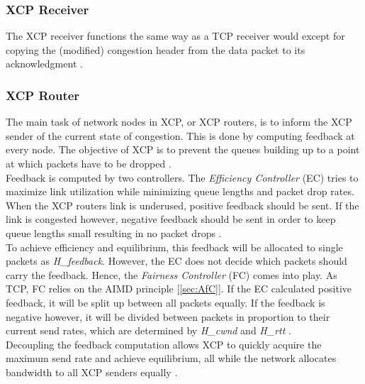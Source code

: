 \documentclass[a4paper,conference]{IEEEtran}
\begin{document}
\subsubsection*{XCP Receiver}
The XCP receiver functions the same way as a TCP receiver would except for copying the (modified) congestion header from the data packet to its acknowledgment \cite{katabi2002congestion}.

\subsubsection*{XCP Router}
The main task of network nodes in XCP, or XCP routers, is to inform the XCP sender of the current state of congestion. This is done by computing feedback at every node. The objective of XCP is to prevent the queues building up to a point at which packets have to be dropped \cite{katabi2002congestion}.\\
Feedback is computed by two controllers. The \textit{Efficiency Controller} (EC) tries to maximize link utilization while minimizing queue lengths and packet drop rates. When the XCP routers link is underused, positive feedback should be sent. If the link is congested however, negative feedback should be sent in order to keep queue lengths small resulting in no packet drops \cite{katabi2002congestion,1498331}.\\
To achieve efficiency and equilibrium, this feedback will be allocated to single packets as \textit{H\_feedback}. However, the EC does not decide which packets should carry the feedback. Hence, the \textit{Fairness Controller} (FC) comes into play. As TCP, FC relies on the AIMD principle [\autoref{sec:AfC}]. If the EC calculated positive feedback, it will be split up between all packets equally. If the feedback is negative however, it will be divided between packets in proportion to their current send rates, which are determined by \textit{H\_cwnd} and \textit{H\_rtt} \cite{katabi2002congestion,1498331}.\\
Decoupling the feedback computation allows XCP to quickly acquire the maximum send rate and achieve equilibrium, all while the network allocates bandwidth to all XCP senders equally \cite{katabi2002congestion}.
\end{document}

